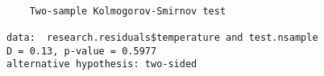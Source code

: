 \begin{verbatim} 

	Two-sample Kolmogorov-Smirnov test

data:  research.residuals$temperature and test.nsample
D = 0.13, p-value = 0.5977
alternative hypothesis: two-sided

\end{verbatim}